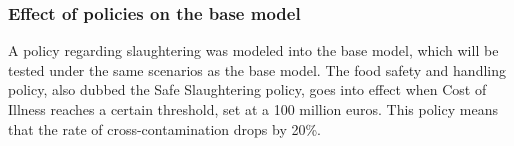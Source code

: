 \iffalse
\subsubsection{Effect of policies on the base model}
A policy regarding slaughtering was modeled into the base model, which will be tested under the same scenarios as the base model. The food safety and handling policy, also dubbed the Safe Slaughtering policy, goes into effect when Cost of Illness reaches a certain threshold, set at a 100 million euros. This policy means that the rate of cross-contamination drops by 20\%.  

